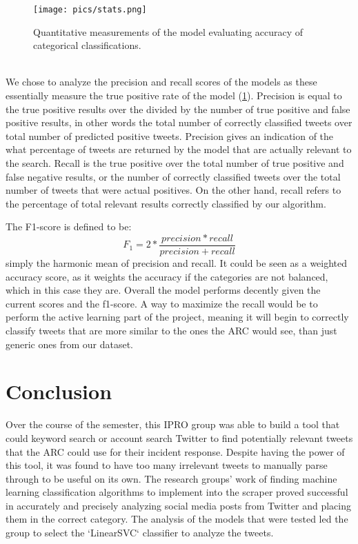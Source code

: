 \documentclass[titlepage, 12pt]{article}
\begin{document}
\begin{figure}[h!]
\centering
\texttt{[image: pics/stats.png]}
\caption{Quantitative measurements of the model evaluating accuracy of categorical classifications.}
\label{fig:stats}
\end{figure}\\

We chose to analyze the precision and recall scores of the models as these essentially measure the true positive rate of the model (\ref{fig:stats}). Precision is equal to the true positive results over the divided by the number of true positive and false positive results, in other words the total number of correctly classified tweets over total number of predicted positive tweets. Precision gives an indication of the what percentage of tweets are returned by the model that are actually relevant to the search. Recall is the true positive over the total number of true positive and false negative results, or the number of correctly classified tweets over the total number of tweets that were actual positives. On the other hand, recall refers to the percentage of total relevant results correctly classified by our algorithm. 

\hspace{0.5 cm}The F1-score is defined to be:
\begin{equation}
    F_1 = 2 * \frac{precision * recall}{precision+recall}
\end{equation}
simply the harmonic mean of precision and recall. It could be seen as a weighted accuracy score, as it weights the accuracy if the categories are not balanced, which in this case they are. Overall the model performs decently given the current scores and the f1-score. A way to maximize the recall would be to perform the active learning part of the project, meaning it will begin to correctly classify tweets that are more similar to the ones the ARC would see, than just generic ones from our dataset. 

\section{Conclusion}
\hspace{0.5 cm}Over the course of the semester, this IPRO group was able to build a tool that could keyword search or account search Twitter to find potentially relevant tweets that the ARC could use for their incident response. Despite having the power of this tool, it was found to have too many irrelevant tweets to manually parse through to be useful on its own. The research groups' work of finding machine learning classification algorithms to implement into the scraper proved successful in accurately and precisely analyzing social media posts from Twitter and placing them in the correct category. The analysis of the models that were tested led the group to select the `LinearSVC` classifier to analyze the tweets.
\end{document}
